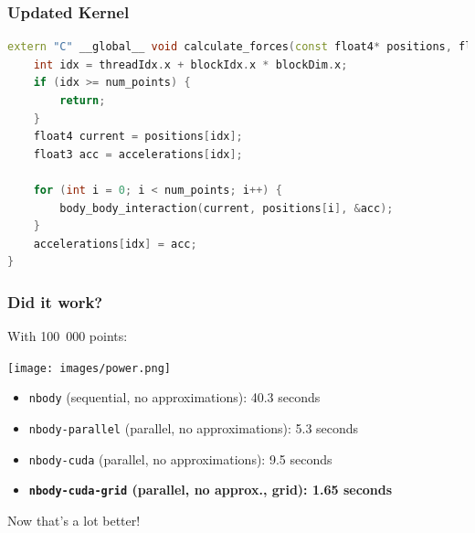 \begin{frame}[fragile]
\frametitle{Updated Kernel}

\begin{lstlisting}[language=C++]
extern "C" __global__ void calculate_forces(const float4* positions, float3* accelerations, int num_points) {
    int idx = threadIdx.x + blockIdx.x * blockDim.x;
    if (idx >= num_points) {
        return;
    }
    float4 current = positions[idx];
    float3 acc = accelerations[idx];

    for (int i = 0; i < num_points; i++) {
        body_body_interaction(current, positions[i], &acc);
    }
    accelerations[idx] = acc;
}
\end{lstlisting}

\end{frame}


\begin{frame}
\frametitle{Did it work?}

With 100~000 points:

\begin{center}
	\texttt{[image: images/power.png]}
\end{center}

\begin{itemize}
	\item \texttt{nbody} (sequential, no approximations): 40.3 seconds
	\item \texttt{nbody-parallel} (parallel, no approximations): 5.3 seconds
	\item \texttt{nbody-cuda} (parallel, no approximations): 9.5 seconds
	\item \textbf{\texttt{nbody-cuda-grid} (parallel, no approx., grid): 1.65 seconds}
\end{itemize}

 Now that's a lot better!

\end{frame}

